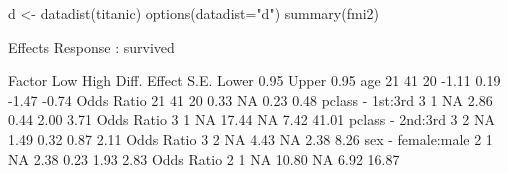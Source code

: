 \begin{Schunk}
\begin{Sinput}
 d <- datadist(titanic)
 options(datadist="d")
 summary(fmi2)
\end{Sinput}
\begin{Soutput}
             Effects              Response : survived 

 Factor            Low High Diff. Effect S.E. Lower 0.95 Upper 0.95
 age               21  41   20    -1.11  0.19 -1.47      -0.74     
  Odds Ratio       21  41   20     0.33    NA  0.23       0.48     
 pclass - 1st:3rd   3   1   NA     2.86  0.44  2.00       3.71     
  Odds Ratio        3   1   NA    17.44    NA  7.42      41.01     
 pclass - 2nd:3rd   3   2   NA     1.49  0.32  0.87       2.11     
  Odds Ratio        3   2   NA     4.43    NA  2.38       8.26     
 sex - female:male  2   1   NA     2.38  0.23  1.93       2.83     
  Odds Ratio        2   1   NA    10.80    NA  6.92      16.87     
\end{Soutput}
\end{Schunk}
